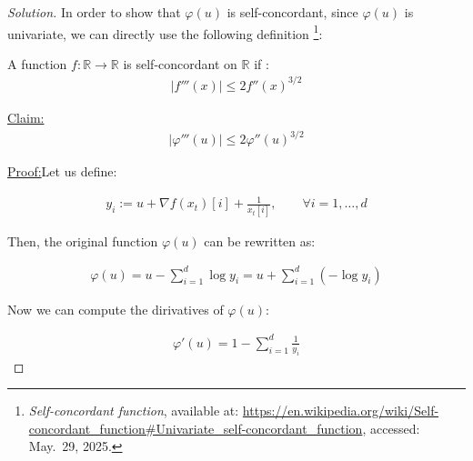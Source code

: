 \documentclass{article}
\newenvironment{solution}
  {\renewcommand\qedsymbol{$\blacksquare$}\begin{proof}[Solution]}
  {\end{proof}}
\newenvironment{claim}[1]{\par\noindent\underline{Claim:}\space#1}{}
\newenvironment{claimproof}[1]{\par\noindent\underline{Proof:}\space#1}{}
\begin{document}
\begin{solution}


In order to show that $\varphi(u)$ is self-concordant, since $\varphi(u)$ is univariate, 
we can directly use the following definition
\footnote{\textit{Self-concordant function}, available at: \url{https://en.wikipedia.org/wiki/Self-concordant_function\#Univariate_self-concordant_function}, accessed: May.~29, 2025.}:


\begin{tcolorbox}[bluebox, title = Self-concordant for univariate functions]
    A function $f: \mathbb{R} \to \mathbb{R}$ is self-concordant on $\mathbb{R}$ if :
    \begin{align*}
        |f'''(x)| \leq 2 f''(x)^{3/2}
    \end{align*}
\end{tcolorbox}

\begin{claim}
    \begin{align*}
        |\varphi'''(u)| \leq 2 \varphi''(u)^{3/2}
    \end{align*}
\end{claim}

\begin{claimproof}
    Let us define:

    \begin{align*}
        y_i := u + \nabla f(x_t)[i] + \frac{1}{x_t[i]}, \qquad \forall i = 1, \dots, d
    \end{align*}

    Then, the original function $\varphi(u)$ can be rewritten as:

    \begin{align*}
        \varphi(u) = u - \sum_{i=1}^d \log y_i = u + \sum_{i=1}^d (-\log y_i)
    \end{align*}

    Now we can compute the dirivatives of $\varphi(u)$:

    \begin{align*}
        \varphi'(u) = 1 - \sum_{i=1}^d \frac{1}{y_i}
    \end{align*}
    

\end{claimproof}
\end{solution}
\end{document}
